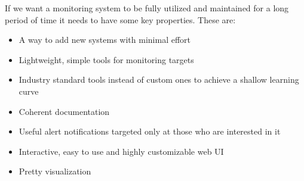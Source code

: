 If we want a monitoring system to be fully utilized and maintained for a long
period of time it needs to have some key properties. These are:
\begin{itemize}
	\item A way to add new systems with minimal effort
	\item Lightweight, simple tools for monitoring targets
	\item Industry standard tools instead of custom ones to achieve a shallow learning curve
	\item Coherent documentation
	\item Useful alert notifications targeted only at those who are interested in it
	\item Interactive, easy to use and highly customizable web UI
	\item Pretty visualization
\end{itemize}
